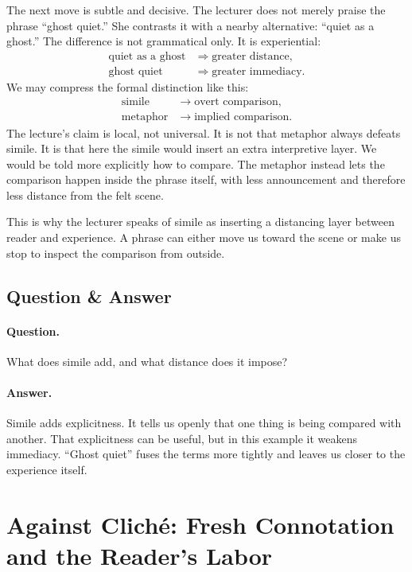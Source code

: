 The next move is subtle and decisive. The lecturer does not merely praise the phrase ``ghost quiet.'' She contrasts it with a nearby alternative: ``quiet as a ghost.'' The difference is not grammatical only. It is experiential:
\begin{align}
\text{quiet as a ghost} &\Rightarrow \text{greater distance},\\
\text{ghost quiet} &\Rightarrow \text{greater immediacy}.
\end{align}
We may compress the formal distinction like this:
\begin{align}
\text{simile} &\to \text{overt comparison},\\
\text{metaphor} &\to \text{implied comparison}.
\end{align}
The lecture's claim is local, not universal. It is not that metaphor always defeats simile. It is that here the simile would insert an extra interpretive layer. We would be told more explicitly how to compare. The metaphor instead lets the comparison happen inside the phrase itself, with less announcement and therefore less distance from the felt scene.

This is why the lecturer speaks of simile as inserting a distancing layer between reader and experience. A phrase can either move us toward the scene or make us stop to inspect the comparison from outside.

\subsection{Question \& Answer}

\paragraph{Question.} What does simile add, and what distance does it impose?

\paragraph{Answer.} Simile adds explicitness. It tells us openly that one thing is being compared with another. That explicitness can be useful, but in this example it weakens immediacy. ``Ghost quiet'' fuses the terms more tightly and leaves us closer to the experience itself.

\section{Against Clich\'e: Fresh Connotation and the Reader's Labor}

